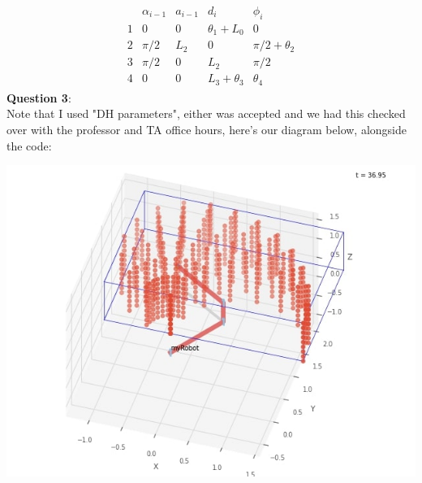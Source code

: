 \documentclass{article}
\begin{document}
\begin{align}
    \begin{array}{c|lcrr}& \alpha_{i-1} & a_{i-1} &  d_{i}  & \phi _{i}
\\\hline1 & 0 & 0 & \theta_1 +L_0 & 0
\\2 & \pi/2 & L_2 & 0 & \pi/2 + \theta_2
\\3 & \pi/2  & 0 & L_2 & \pi/2
\\4 & 0  & 0 & L_3+\theta_3 & \theta_4
\end{array} 
\end{align}
\textbf{Question 3}:\\
Note that I used "DH parameters", either was accepted and we had this checked over with the professor and TA office hours, here's our diagram below, alongside the code:
\begin{center}
            \includegraphics[scale=0.5]{workspace.jpg}
        \end{center}
\end{document}
